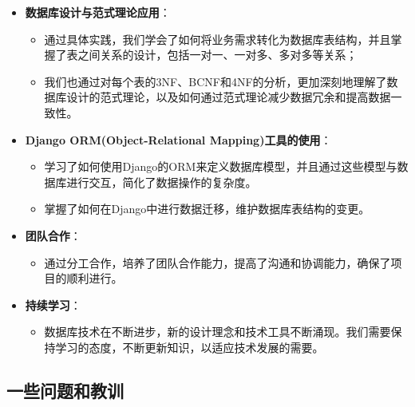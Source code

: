 \documentclass{ctexart}
\begin{document}
	\begin{itemize}
		\item \textbf{数据库设计与范式理论应用}：
		\begin{itemize}
			\item 通过具体实践，我们学会了如何将业务需求转化为数据库表结构，并且掌握了表之间关系的设计，包括一对一、一对多、多对多等关系；
			\item 我们也通过对每个表的3NF、BCNF和4NF的分析，更加深刻地理解了数据库设计的范式理论，以及如何通过范式理论减少数据冗余和提高数据一致性。
		\end{itemize}

		
		\item \textbf{Django ORM(Object-Relational Mapping)工具的使用}：
		\begin{itemize}
			\item 学习了如何使用Django的ORM来定义数据库模型，并且通过这些模型与数据库进行交互，简化了数据操作的复杂度。
			\item 掌握了如何在Django中进行数据迁移，维护数据库表结构的变更。
		\end{itemize}
		
		\item \textbf{团队合作}：
		\begin{itemize}
			\item 通过分工合作，培养了团队合作能力，提高了沟通和协调能力，确保了项目的顺利进行。
		\end{itemize}
        \item \textbf{持续学习}：
        \begin{itemize}
            \item 数据库技术在不断进步，新的设计理念和技术工具不断涌现。我们需要保持学习的态度，不断更新知识，以适应技术发展的需要。
		\end{itemize}
	\end{itemize}
	
	\subsection{一些问题和教训}
	
\end{document}
